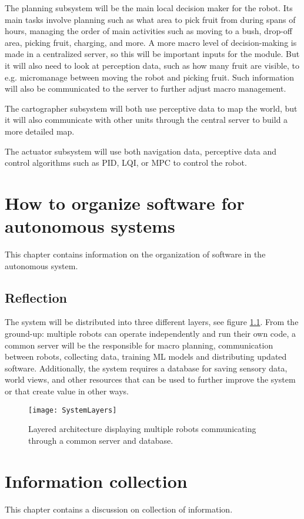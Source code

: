\documentclass[%
oneside,    %
project,    %
nosummary   %
]{USN-MSc}
\begin{document}
The planning subsystem will be the main local decision maker for the robot. Its main tasks involve planning such as what area to pick fruit from during spans of hours, managing the order of main activities such as moving to a bush, drop-off area, picking fruit, charging, and more. A more macro level of decision-making is made in a centralized server, so this will be important inputs for the module. But it will also need to look at perception data, such as how many fruit are visible, to e.g. micromanage between moving the robot and picking fruit. Such information will also be communicated to the server to further adjust macro management.

The cartographer subsystem will both use perceptive data to map the world, but it will also communicate with other units through the central server to build a more detailed map.

The actuator subsystem will use both navigation data, perceptive data and control algorithms such as PID, LQI, or MPC to control the robot.

\chapter{How to organize software for autonomous systems}
\label{ch:softOrganz}
This chapter contains information on the organization of software in the autonomous system.
\section{Reflection}
The system will be distributed into three different layers, see figure \ref{fig:layers}.
From the ground-up: multiple robots can operate independently and run their own code, a common server will be the responsible for macro planning, communication between robots, collecting data, training ML models and distributing updated software. Additionally, the system requires a database for saving sensory data, world views, and other resources that can be used to further improve the system or that create value in other ways.

\begin{figure}[!ht]
  \centering
  \texttt{[image: SystemLayers]}
  \caption{Layered architecture displaying multiple robots communicating through a common server and database.}
  \label{fig:layers}
\end{figure}

\chapter{Information collection}
\label{ch:infoCol}
This chapter contains a discussion on collection of information.
\end{document}
